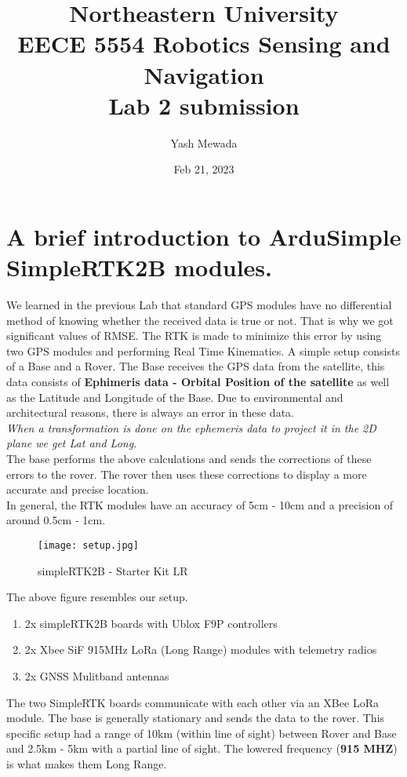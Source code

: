 \documentclass[a4paper]{article}
\title{Northeastern University\\EECE 5554 Robotics Sensing and Navigation \\ Lab 2 submission}
\author{Yash Mewada}
\date{Feb 21, 2023}
\begin{document}
\maketitle
\section{A brief introduction to ArduSimple SimpleRTK2B modules.}
We learned in the previous Lab that standard GPS modules have no differential method of knowing whether the received data is true or not. That is why we got significant values of RMSE. The RTK is made to minimize this error by using two GPS modules and performing Real Time Kinematics. A simple setup consists of a Base and a Rover. The Base receives the GPS data from the satellite, this data consists of \textbf{Ephimeris data - Orbital Position of the satellite} as well as the Latitude and Longitude of the Base. Due to environmental and architectural reasons, there is always an error in these data. \\
\textit{When a transformation is done on the ephemeris data to project it in the 2D plane we get Lat and Long.} \\
The base performs the above calculations and sends the corrections of these errors to the rover. The rover then uses these corrections to display a more accurate and precise location.\\
In general, the RTK modules have an accuracy of 5cm - 10cm and a precision of around 0.5cm - 1cm.\\
\begin{figure}[h]
    \centering
    \texttt{[image: setup.jpg]}
    \caption{simpleRTK2B - Starter Kit LR}
    \label{fig:simpleRTK2B - Starter Kit LR}
\end{figure}
The above figure resembles our setup.\\
\begin{enumerate}
    \item 2x simpleRTK2B boards with Ublox F9P controllers
    \item 2x Xbee SiF 915MHz LoRa (Long Range) modules with telemetry radios
    \item 2x GNSS Mulitband antennas
\end{enumerate}
The two SimpleRTK boards communicate with each other via an XBee LoRa module. The base is generally stationary and sends the data to the rover. This specific setup had a range of 10km (within line of sight) between Rover and Base and 2.5km - 5km with a partial line of sight. The lowered frequency (\textbf{915 MHZ}) is what makes them Long Range.\\
\end{document}
